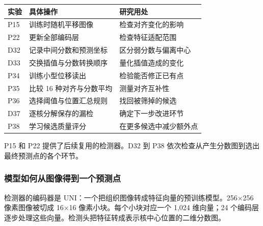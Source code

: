\documentclass[
  12pt,
  fontset=fandol]{ctexart}
\newcounter{none} %
\begin{document}
{\def\LTcaptype{none}
\begin{longtable}[]{@{}
  >{\raggedright\arraybackslash}p{}
  >{\raggedright\arraybackslash}p{}
  >{\raggedright\arraybackslash}p{}@{}}
\toprule\noalign{}
实验 & 具体操作 & 研究用处\\
\midrule\noalign{}
\endhead
\bottomrule\noalign{}
\endlastfoot
P15 & 训练时随机平移图像 & 检查对齐变化的影响\\
P22 & 更新全部编码层 & 检查特征适配范围\\
D32 & 记录中间分数和预测坐标 & 区分弱分数与偏离中心\\
D33 & 交换插值与分数转换顺序 & 量化插值造成的变化\\
P34 & 训练小型位移读出 & 检验能否修正已有点\\
P35 & 比较 16 种对齐与分数平均 & 测量对齐互补性\\
P36 & 选择阈值与位置汇总规则 & 找回被筛掉的候选\\
D37 & 逐核分解保存的漏检 & 确定下一步改进环节\\
P38 & 学习候选质量评分 & 在更多候选中减少额外点\\
\end{longtable}}
P15 和 P22 提供了后续复用的检测器。D32 到 P38 依次检查从产生分数图到选出最终预测点的各个环节。

\subsubsection{模型如何从图像得到一个预测点}\label{chapter2}
检测器的编码器是 UNI：一个把组织图像转成特征向量的预训练模型。256×256 像素图像被切成 16×16 像素小块。每个小块对应一个 1,024 维向量；24 个编码层逐步处理这些向量。检测头把特征转成表示核中心位置的二维分数图。
\end{document}
